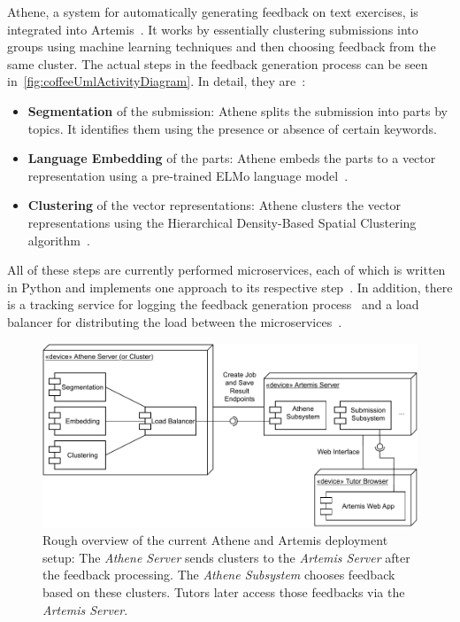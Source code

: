Athene, a system for automatically generating feedback on text exercises, is integrated into Artemis~\cite{cofee}. It works by essentially clustering submissions into groups using machine learning techniques and then choosing feedback from the same cluster. The actual steps in the feedback generation process can be seen in~\cref{fig:coffeeUmlActivityDiagram}. In detail, they are~\cite{cofee}:
\begin{itemize}
    \item \textbf{Segmentation} of the submission: Athene splits the submission into parts by topics. It identifies them using the presence or absence of certain keywords.
    \item \textbf{Language Embedding} of the parts: Athene embeds the parts to a vector representation using a pre-trained ELMo language model~\cite{deepContextualizedWordRepresentations}.
    \item \textbf{Clustering} of the vector representations: Athene clusters the vector representations using the Hierarchical Density-Based Spatial Clustering algorithm~\cite{hdbsc}.
\end{itemize}

All of these steps are currently performed microservices, each of which is written in Python and implements one approach to its respective step~\cite{cofee}.
In addition, there is a tracking service for logging the feedback generation process~\cite{atheneTracking} and a load balancer for distributing the load between the microservices~\cite{atheneLoadBalancer}.

\begin{figure}[ht]
    \centering
    \includegraphics[width=0.8\linewidth]{figures/proposal/deployment-diagram.pdf}
    \caption{Rough overview of the current Athene and Artemis deployment setup: The \textit{Athene Server} sends clusters to the \textit{Artemis Server} after the feedback processing. The \textit{Athene Subsystem} chooses feedback based on these clusters. Tutors later access those feedbacks via the \textit{Artemis Server}.}
    \label{fig:atheneArtemisDeployment}
\end{figure}

